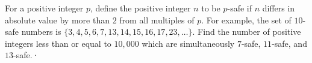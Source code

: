 For a positive integer $p$, define the positive integer $n$ to be $p$-safe if $n$ differs in absolute value by more than $2$ from all multiples of $p$. For example, the set of $10$-safe numbers is $\{3, 4, 5, 6, 7, 13, 14, 15, 16, 17,23, \ldots \}$. Find the number of positive integers less than or equal to $10,000$ which are simultaneously $7$-safe, $11$-safe, and $13$-safe.·
